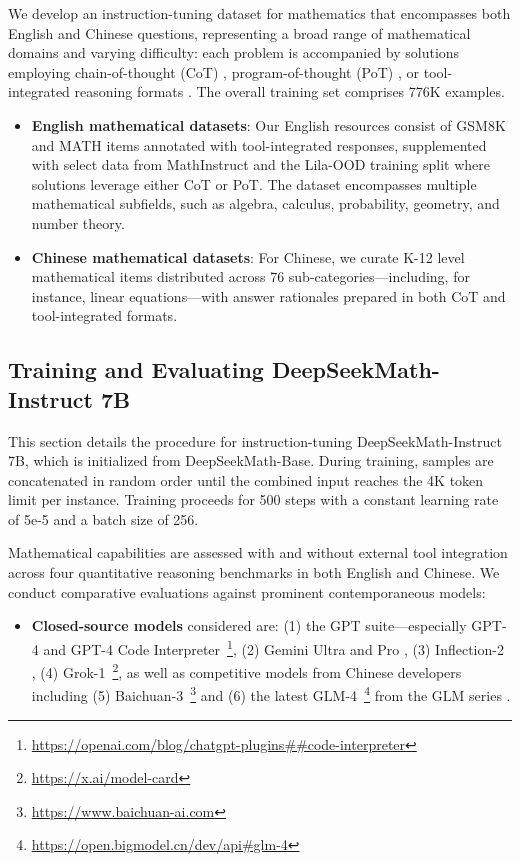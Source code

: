 We develop an instruction-tuning dataset for mathematics that encompasses both English and Chinese questions, representing a broad range of mathematical domains and varying difficulty: each problem is accompanied by solutions employing chain-of-thought (CoT) \citep{cot}, program-of-thought (PoT) \citep{pot,pal}, or tool-integrated reasoning formats \citep{tora}. The overall training set comprises 776K examples.

\begin{itemize}[topsep=0pt]
    \item \textbf{English mathematical datasets}: Our English resources consist of GSM8K and MATH items annotated with tool-integrated responses, supplemented with select data from MathInstruct \citep{MathInstruct} and the Lila-OOD training split \citep{lila} where solutions leverage either CoT or PoT. The dataset encompasses multiple mathematical subfields, such as algebra, calculus, probability, geometry, and number theory.
    \item \textbf{Chinese mathematical datasets}: For Chinese, we curate K-12 level mathematical items distributed across 76 sub-categories—including, for instance, linear equations—with answer rationales prepared in both CoT and tool-integrated formats.
\end{itemize}

\subsection{Training and Evaluating DeepSeekMath-Instruct 7B}

This section details the procedure for instruction-tuning DeepSeekMath-Instruct 7B, which is initialized from DeepSeekMath-Base. During training, samples are concatenated in random order until the combined input reaches the 4K token limit per instance. Training proceeds for 500 steps with a constant learning rate of 5e-5 and a batch size of 256.

Mathematical capabilities are assessed with and without external tool integration across four quantitative reasoning benchmarks in both English and Chinese. We conduct comparative evaluations against prominent contemporaneous models:

\begin{itemize}[topsep=0pt]
    \item \textbf{Closed-source models} considered are: (1) the GPT suite—especially GPT-4 \citep{gpt4} and GPT-4 Code Interpreter~\footnote{\url{https://openai.com/blog/chatgpt-plugins\#\#code-interpreter}}, (2) Gemini Ultra and Pro \citep{gemini}, (3) Inflection-2 \citep{inflection-2}, (4) Grok-1~\footnote{\url{https://x.ai/model-card}}, as well as competitive models from Chinese developers including (5) Baichuan-3~\footnote{\url{https://www.baichuan-ai.com}} and (6) the latest GLM-4~\footnote{\url{https://open.bigmodel.cn/dev/api\#glm-4}}
    from the GLM series \citep{glm}.
\end{itemize}

